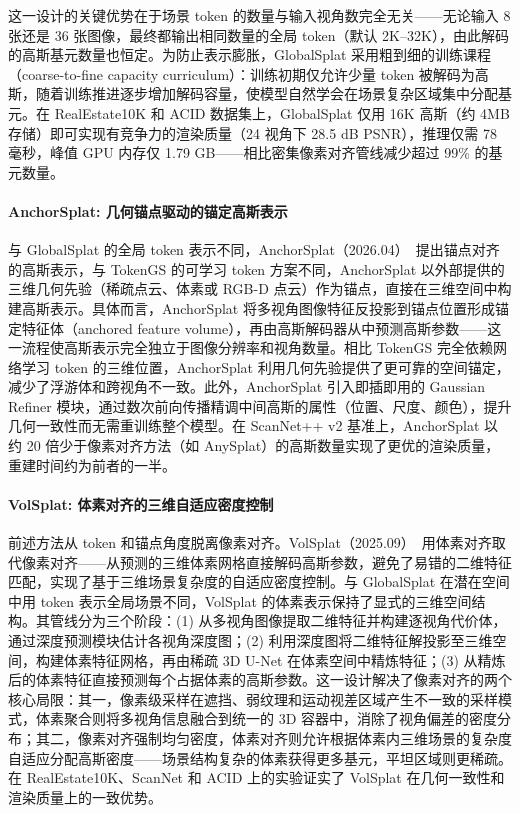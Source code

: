 这一设计的关键优势在于场景 token 的数量与输入视角数完全无关——无论输入 8 张还是 36 张图像，最终都输出相同数量的全局 token（默认 2K--32K），由此解码的高斯基元数量也恒定。为防止表示膨胀，GlobalSplat 采用粗到细的训练课程（coarse-to-fine capacity curriculum）：训练初期仅允许少量 token 被解码为高斯，随着训练推进逐步增加解码容量，使模型自然学会在场景复杂区域集中分配基元。在 RealEstate10K 和 ACID 数据集上，GlobalSplat 仅用 16K 高斯（约 4MB 存储）即可实现有竞争力的渲染质量（24 视角下 28.5 dB PSNR），推理仅需 78 毫秒，峰值 GPU 内存仅 1.79 GB——相比密集像素对齐管线减少超过 99\% 的基元数量。

\paragraph{AnchorSplat: 几何锚点驱动的锚定高斯表示}

与 GlobalSplat 的全局 token 表示不同，AnchorSplat（2026.04）~\cite{2604_07053}提出锚点对齐的高斯表示，与 TokenGS 的可学习 token 方案不同，AnchorSplat 以外部提供的三维几何先验（稀疏点云、体素或 RGB-D 点云）作为锚点，直接在三维空间中构建高斯表示。具体而言，AnchorSplat 将多视角图像特征反投影到锚点位置形成锚定特征体（anchored feature volume），再由高斯解码器从中预测高斯参数——这一流程使高斯表示完全独立于图像分辨率和视角数量。相比 TokenGS 完全依赖网络学习 token 的三维位置，AnchorSplat 利用几何先验提供了更可靠的空间锚定，减少了浮游体和跨视角不一致。此外，AnchorSplat 引入即插即用的 Gaussian Refiner 模块，通过数次前向传播精调中间高斯的属性（位置、尺度、颜色），提升几何一致性而无需重训练整个模型。在 ScanNet++ v2 基准上，AnchorSplat 以约 20 倍少于像素对齐方法（如 AnySplat）的高斯数量实现了更优的渲染质量，重建时间约为前者的一半。

\paragraph{VolSplat: 体素对齐的三维自适应密度控制}

前述方法从 token 和锚点角度脱离像素对齐。VolSplat（2025.09）~\cite{2509_19297}用体素对齐取代像素对齐——从预测的三维体素网格直接解码高斯参数，避免了易错的二维特征匹配，实现了基于三维场景复杂度的自适应密度控制。与 GlobalSplat 在潜在空间中用 token 表示全局场景不同，VolSplat 的体素表示保持了显式的三维空间结构。其管线分为三个阶段：(1) 从多视角图像提取二维特征并构建逐视角代价体，通过深度预测模块估计各视角深度图；(2) 利用深度图将二维特征解投影至三维空间，构建体素特征网格，再由稀疏 3D U-Net 在体素空间中精炼特征；(3) 从精炼后的体素特征直接预测每个占据体素的高斯参数。这一设计解决了像素对齐的两个核心局限：其一，像素级采样在遮挡、弱纹理和运动视差区域产生不一致的采样模式，体素聚合则将多视角信息融合到统一的 3D 容器中，消除了视角偏差的密度分布；其二，像素对齐强制均匀密度，体素对齐则允许根据体素内三维场景的复杂度自适应分配高斯密度——场景结构复杂的体素获得更多基元，平坦区域则更稀疏。在 RealEstate10K、ScanNet 和 ACID 上的实验证实了 VolSplat 在几何一致性和渲染质量上的一致优势。

